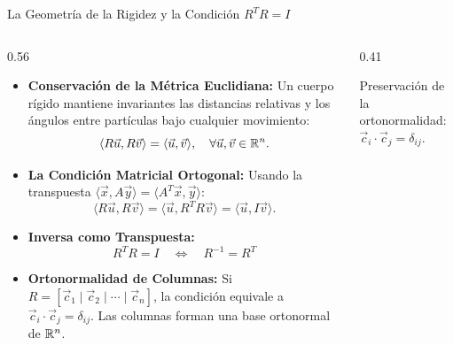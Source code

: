 \documentclass[10pt,aspectratio=169]{beamer}
\begin{document}
\begin{frame}{La Geometría de la Rigidez y la Condición $R^T R = I$}
  \begin{columns}[c]
    \begin{column}{0.56\textwidth}
      \footnotesize
      \begin{itemize}\itemsep2pt
        \item \textbf{Conservación de la Métrica Euclidiana:}
        Un cuerpo rígido mantiene invariantes las distancias relativas y los ángulos entre partículas bajo cualquier movimiento:
        \[
        \langle R\vec{u}, R\vec{v} \rangle = \langle \vec{u}, \vec{v} \rangle, \quad \forall \vec{u}, \vec{v} \in \mathbb{R}^n.
        \]
        \item \textbf{La Condición Matricial Ortogonal:}
        Usando la transpuesta $\langle \vec{x}, A\vec{y} \rangle = \langle A^T\vec{x}, \vec{y} \rangle$:
        \[
        \langle R\vec{u}, R\vec{v} \rangle = \langle \vec{u}, R^T R\vec{v} \rangle = \langle \vec{u}, I\vec{v} \rangle.
        \]
        \item \textbf{Inversa como Transpuesta:}
        \[
        \boxed{R^T R = I \quad \Longleftrightarrow \quad R^{-1} = R^T}
        \]
        \item \textbf{Ortonormalidad de Columnas:}
        Si $R = [\vec{c}_1 \mid \vec{c}_2 \mid \cdots \mid \vec{c}_n]$, la condición equivale a $\vec{c}_i \cdot \vec{c}_j = \delta_{ij}$. Las columnas forman una base ortonormal de $\mathbb{R}^n$.
      \end{itemize}
    \end{column}
    \begin{column}{0.41\textwidth}
      \centering
      \vspace{0.15cm}
      {\scriptsize Preservación de la ortonormalidad: $\vec{c}_i \cdot \vec{c}_j = \delta_{ij}$.}
    \end{column}
  \end{columns}
\end{frame}
\end{document}
